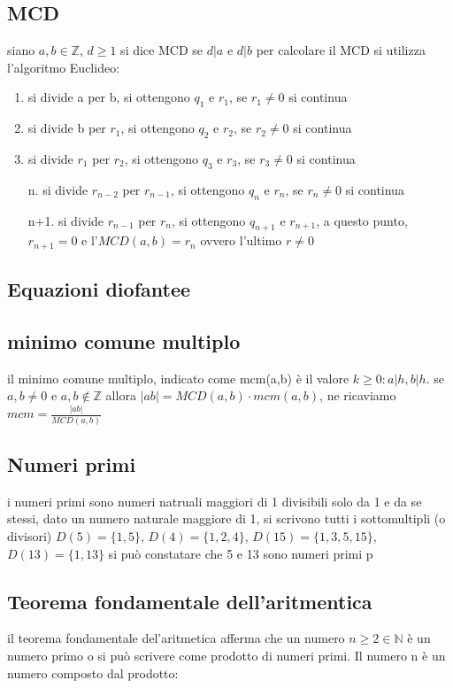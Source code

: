 \documentclass{article}
\begin{document}
    \subsection{MCD}
        siano $a,b\in \mathbb{Z}$, $d\geq 1$ si dice MCD se $d|a$ e $d|b$
        per calcolare il MCD si utilizza l'algoritmo Euclideo:

        \begin{enumerate}
            \item si divide a per b, si ottengono $q_1$ e $r_1$, se $r_1\neq 0$ si continua
            \item si divide b per $r_1$, si ottengono $q_2$ e $r_2$, se $r_2\neq0$ si continua
            \item si divide $r_1$ per $r_2$, si ottengono $q_3$ e $r_3$, se $r_3\neq0$ si continua
            \item[n.] si divide $r_{n-2}$ per $r_{n-1}$, si ottengono $q_n$ e $r_n$, se $r_n\neq0$ si continua
            \item[n+1.] si divide $r_{n-1}$ per $r_n$, si ottengono $q_{n+1}$ e $r_{n+1}$, a questo punto, $r_{n+1}=0$ e l'$MCD(a,b)=r_n$ ovvero l'ultimo $r\neq0$
        \end{enumerate}

    \subsection{Equazioni diofantee}

    \subsection{minimo comune multiplo}
        il minimo comune multiplo, indicato come mcm(a,b) è il valore $k\geq 0:a|h, b|h$.
        se $a,b\neq 0$ e $a,b\notin \mathbb{Z}$ allora $|ab|= MCD(a,b)\cdot mcm(a,b)$, ne ricaviamo $mcm=\frac{|ab|}{MCD(a,b)}$
    \subsection{Numeri primi}
        i numeri primi sono numeri natruali maggiori di 1 divisibili solo da 1 e da se stessi, dato un numero naturale maggiore di 1, si scrivono tutti i sottomultipli (o divisori) $D(5)=\{1,5\}$, $D(4)=\{1,2,4\}$, $D(15)=\{1,3,5,15\}$, $D(13)=\{1,13\}$ si può constatare che 5 e 13 sono numeri primi p

    \subsection{Teorema fondamentale dell'aritmentica}
        il teorema fondamentale del'aritmetica afferma che un numero $n\geq 2\in \mathbb{N}$ è un numero primo o si può scrivere come prodotto di numeri primi. Il numero n è un numero composto dal prodotto:
\end{document}
